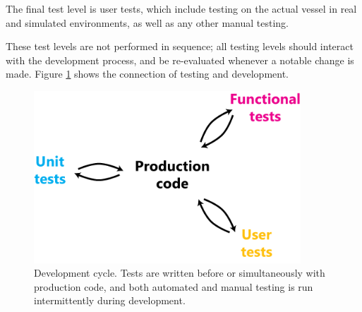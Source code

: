 The final test level is user tests, which include testing on the actual vessel in real and simulated environments, as well as any other manual testing.

These test levels are not performed in sequence; all testing levels should interact with the development process, and be re-evaluated whenever a notable change is made. Figure \ref{fig:software-testing} shows the connection of testing and development.

\begin{figure}
\includegraphics[width=100mm,natwidth=494,natheight=299]{"./image/software-testing"}
\caption[Software development cycle]{\label{fig:software-testing}Development cycle. Tests are written before or simultaneously with production code, and both automated and manual testing is run intermittently during development.}
\end{figure}
